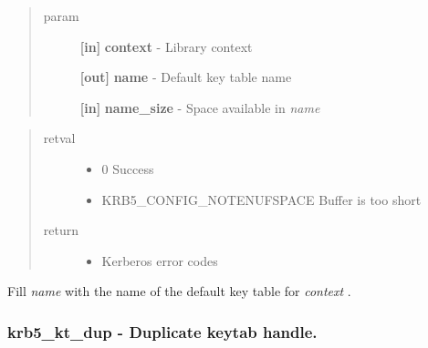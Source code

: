 \documentclass[letterpaper,10pt,english]{sphinxmanual}
\begin{document}
\begin{fulllineitems}
\label{appdev/refs/api/krb5_kt_default_name:krb5_kt_default_name}
\end{fulllineitems}

\begin{quote}\begin{description}
\item[{param}] \leavevmode
\textbf{{[}in{]}} \textbf{context} - Library context

\textbf{{[}out{]}} \textbf{name} - Default key table name

\textbf{{[}in{]}} \textbf{name\_size} - Space available in \emph{name}

\end{description}\end{quote}
\begin{quote}\begin{description}
\item[{retval}] \leavevmode\begin{itemize}
\item {} 
0   Success

\item {} 
KRB5\_CONFIG\_NOTENUFSPACE   Buffer is too short

\end{itemize}

\item[{return}] \leavevmode\begin{itemize}
\item {} 
Kerberos error codes

\end{itemize}

\end{description}\end{quote}

Fill \emph{name} with the name of the default key table for \emph{context} .


\subsubsection{krb5\_kt\_dup -  Duplicate keytab handle.}
\label{appdev/refs/api/krb5_kt_dup:krb5-kt-dup-duplicate-keytab-handle}\label{appdev/refs/api/krb5_kt_dup::doc}
\end{document}
